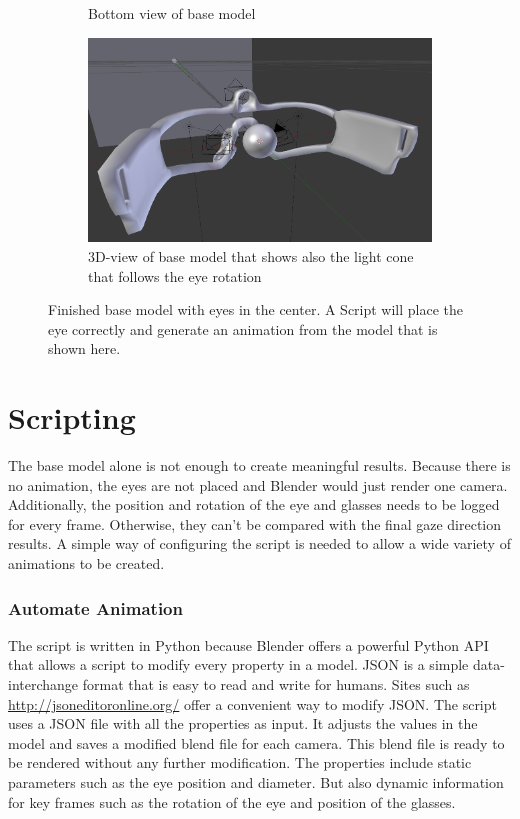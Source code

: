 \begin{figure}
\begin{subfigure}{.5\textwidth}
		\caption{Bottom view of base model}
		\label{fig:baseBottom}
	\end{subfigure}
	\begin{subfigure}{.5\textwidth}
		\centering
		\includegraphics[width=0.9\linewidth]{images/base_model_3D.png}
		\caption{3D-view of base model that shows also the light cone that follows the eye rotation}
		\label{fig:base3D}
	\end{subfigure}
	\caption{Finished base model with eyes in the center. A Script will place the eye correctly and generate an animation from the model that is shown here.}
	\label{fig:baseModel}
\end{figure}
\section{Scripting}
The base model alone is not enough to create meaningful results. Because there is no animation, the eyes are not placed and Blender would just render one camera. Additionally, the position and rotation of the eye and glasses needs to be logged for every frame. Otherwise, they can't be compared with the final gaze direction results. A simple way of configuring the script is needed to allow a wide variety of animations to be created.
\subsubsection{Automate Animation}
The script is written in Python because Blender offers a powerful Python \gls{API} that allows a script to modify every property in a model.
\gls{JSON} is a simple data-interchange format that is easy to read and write for humans. Sites such as \url{http://jsoneditoronline.org/} offer a convenient way to modify \gls{JSON}. The script uses a \gls{JSON} file with all the properties as input. It adjusts the values in the model and saves a modified blend file for each camera. This blend file is ready to be rendered without any further modification. The properties include static parameters such as the eye position and diameter. But also dynamic information for key frames such as the rotation of the eye and position of the glasses.
